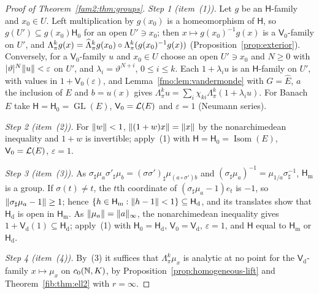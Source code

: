 \begin{proof}[Proof of Theorem~\ref{fam2:thm:groups}]
\emph{Step 1 (item~(1)).} Let $g$ be an $\mathsf H$-family and $x_0\in U$. Left multiplication by $g(x_0)$ is a
homeomorphism of $\mathsf H$, so $g(U')\subseteq g(x_0)\mathsf H_0$ for an open $U'\ni x_0$; then
$x\mapsto g(x_0)^{-1}g(x)$ is a $\mathsf V_0$-family on $U'$, and $\Lambda^k_\pi g(x)=\widehat\Lambda^k_\pi g(x_0)\circ
\Lambda^k_\pi(g(x_0)^{-1}g(x))$ (Proposition~\ref{prop:exterior}). Conversely, for a $\mathsf V_0$-family $u$ and $x_0\in U$
choose an open $U'\ni x_0$ and $N\ge0$ with $\lvert \vartheta\rvert^N\lVert u\rVert<\varepsilon$ on $U'$, and $\lambda_i=\vartheta^{N+i}$,
$0\le i\le k$. Each $1+\lambda_iu$ is an $\mathsf H$-family on $U'$, with values in $1+\mathsf V_0(\varepsilon)$, and
Lemma~\ref{fmo:lem:vandermonde} with $G=\widehat E$, $a$ the inclusion of $E$ and $b=u(x)$ gives
$\Lambda^k_\pi u=\sum_i\chi_{ki}\Lambda^k_\pi(1+\lambda_iu)$. For Banach $E$ take $\mathsf H=\mathsf H_0=\operatorname{GL}(E)$,
$\mathsf V_0=\mathcal L(E)$ and $\varepsilon=1$ (Neumann series).

\emph{Step 2 (item~(2)).} For $\lVert w\rVert<1$, $\lVert (1+w)x\rVert=\lVert x\rVert$ by the nonarchimedean inequality and $1+w$ is
invertible; apply~(1) with $\mathsf H=\mathsf H_0=\operatorname{Isom}(E)$, $\mathsf V_0=\mathcal L(E)$, $\varepsilon=1$.

\emph{Step 3 (item~(3)).} As $\sigma_\sharp\mu_a\sigma'_\sharp\mu_b=(\sigma\sigma')_\sharp\mu_{(a\circ\sigma')b}$ and
$(\sigma_\sharp\mu_a)^{-1}=\mu_{1/a}\sigma^{-1}_\sharp$, $\mathsf H_{\mathrm m}$ is a group. If $\sigma(t)\ne t$, the $t$th
coordinate of $(\sigma_\sharp\mu_a-1)e_t$ is $-1$, so $\lVert \sigma_\sharp\mu_a-1\rVert\ge1$; hence $\{h\in\mathsf H_{\mathrm m}:
\lVert h-1\rVert<1\}\subseteq\mathsf H_{\mathrm d}$, and its translates show that $\mathsf H_{\mathrm d}$ is open in
$\mathsf H_{\mathrm m}$. As $\lVert \mu_a\rVert=\lVert a\rVert_\infty$, the nonarchimedean inequality gives $1+\mathsf V_{\mathrm d}(1)
\subseteq\mathsf H_{\mathrm d}$; apply~(1) with $\mathsf H_0=\mathsf H_{\mathrm d}$, $\mathsf V_0=\mathsf V_{\mathrm d}$,
$\varepsilon=1$, and $\mathsf H$ equal to $\mathsf H_{\mathrm m}$ or $\mathsf H_{\mathrm d}$.

\emph{Step 4 (item~(4)).} By~(3) it suffices that $\Lambda^k_\pi\mu_x$ is analytic at no point for the
$\mathsf V_{\mathrm d}$-family $x\mapsto\mu_x$ on $c_0(\mathbb N,K)$, by Proposition~\ref{prop:homogeneous-lift} and
Theorem~\ref{fib:thm:ell2} with $r=\infty$.
\end{proof}

